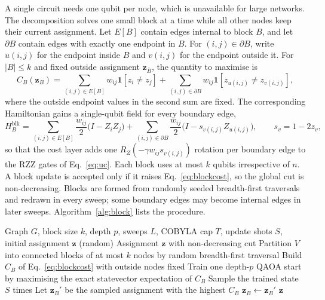\documentclass[pdflatex,sn-mathphys-num]{sn-jnl}
\theoremstyle{thmstyleone}
\theoremstyle{thmstyletwo}
\theoremstyle{thmstylethree}
\begin{document}
A single circuit needs one qubit per node, which is unavailable for large networks. The decomposition solves one small block at a time while all other nodes keep their current assignment. Let $E[B]$ contain edges internal to block $B$, and let $\partial B$ contain edges with exactly one endpoint in $B$. For $(i,j)\in\partial B$, write $u(i,j)$ for the endpoint inside $B$ and $v(i,j)$ for the endpoint outside it. For $|B|\le k$ and fixed outside assignment $\mathbf{z}_{\bar B}$, the quantity to maximise is
\begin{equation}
  C_B(\mathbf{z}_B) = \sum_{(i,j)\in E[B]} w_{ij}\mathbf{1}[z_i\neq z_j] + \sum_{(i,j)\in\partial B} w_{ij}\mathbf{1}[z_{u(i,j)}\neq z_{v(i,j)}],
  \label{eq:blockcost}
\end{equation}
where the outside endpoint values in the second sum are fixed. The corresponding Hamiltonian gains a single-qubit field for every boundary edge,
\begin{equation}
  H_B^{\mathrm{blk}} = \sum_{(i,j)\in E[B]}\frac{w_{ij}}{2}\bigl(I-Z_iZ_j\bigr) + \sum_{(i,j)\in\partial B}\frac{w_{ij}}{2}\bigl(I-s_{v(i,j)}Z_{u(i,j)}\bigr),
  \qquad s_v = 1-2z_v,
  \label{eq:blockham}
\end{equation}
so that the cost layer adds one $R_Z(-\gamma w_{ij}s_{v(i,j)})$ rotation per boundary edge to the $\mathrm{RZZ}$ gates of Eq.~\eqref{eq:uc}. Each block uses at most $k$ qubits irrespective of $n$. A block update is accepted only if it raises Eq.~\eqref{eq:blockcost}, so the global cut is non-decreasing. Blocks are formed from randomly seeded breadth-first traversals and redrawn in every sweep; some boundary edges may become internal edges in later sweeps. Algorithm~\ref{alg:block} lists the procedure.

\begin{algorithm}[t]
\caption{Exact-training block-coordinate QAOA}\label{alg:block}
\begin{algorithmic}[1]
\Require Graph $G$, block size $k$, depth $p$, sweeps $L$, COBYLA cap $T$, update shots $S$, initial assignment $\mathbf{z}$ (random)
\Ensure Assignment $\mathbf{z}$ with non-decreasing cut
  \State Partition $V$ into connected blocks of at most $k$ nodes by random breadth-first traversal
    \State Build $C_B$ of Eq.~\eqref{eq:blockcost} with outside nodes fixed
    \State Train one depth-$p$ QAOA start by maximising the exact statevector expectation of $C_B$
    \State Sample the trained state $S$ times
    \State Let $\mathbf{z}_B'$ be the sampled assignment with the highest $C_B$
     \State $\mathbf{z}_B\leftarrow\mathbf{z}_B'$ \EndIf
  \EndFor
\EndFor
\State \Return $\mathbf{z}$
\end{algorithmic}
\end{algorithm}
\end{document}
